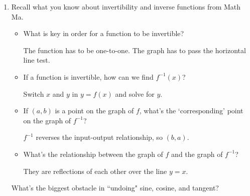 \documentclass[main]{subfiles}
\begin{document}
\begin{enumerate}
\item Recall what you know about invertibility and inverse functions
  from Math Ma.
  \begin{itemize}[topsep=0pt]
    \item
    \begin{problem}[\stretch{0.25}]
    What is key in order for a function to be invertible?
    \end{problem}

    \begin{solution}
      The function has to be one-to-one.
      The graph has to pass
      the horizontal line test.
    \end{solution}

    \item
    \begin{problem}[\stretch{0.25}]
    If a function is invertible, how can we find $f^{-1}(x)$?
    \end{problem}

    \begin{solution}
        Switch $x$ and $y$ in $y=f(x)$ and
        solve for $y$.
    \end{solution}

    \item
    \begin{problem}[\stretch{0.25}]
    If $(a,b)$ is a point on the graph of $f$, what's the `corresponding'
    point on the graph of $f^{-1}$?
    \end{problem}

    \begin{solution}
        $f^{-1}$ reverses the input-output
        relationship, so $(b,a)$.
    \end{solution}

    \item
    \begin{problem}[\stretch{0.25}]
    What's the relationship between the graph of $f$ and the graph of 
    $f^{-1}$?
    \end{problem}

    \begin{solution}
        They are reflections of each other
        over the line $y=x$.
    \end{solution}
  \end{itemize}
  
  \begin{problem}[\stretch{0.25}]
  What's the biggest obstacle in ``undoing" sine, cosine, and tangent?
  \end{problem}


\end{enumerate}
\end{document}
